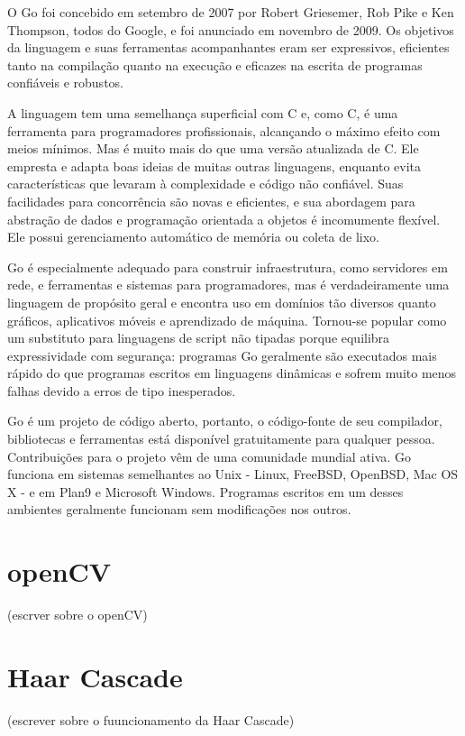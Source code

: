 \documentclass[12pt, %
openright, 
oneside, %
a4paper,    %
brazil]{facom-ufu-abntex2}
\begin{document}
O Go foi concebido em setembro de 2007 por Robert Griesemer, Rob Pike e Ken
Thompson, todos do Google, e foi anunciado em novembro de 2009. Os objetivos da
linguagem e suas ferramentas acompanhantes eram ser expressivos, eficientes
tanto na compilação quanto na execução e eficazes na escrita de programas
confiáveis e robustos.

A linguagem tem uma semelhança superficial com C e, como C, é uma ferramenta
para programadores profissionais, alcançando o máximo efeito com meios mínimos.
Mas é muito mais do que uma versão atualizada de C. Ele empresta e adapta boas
ideias de muitas outras linguagens, enquanto evita características que levaram
à complexidade e código não confiável. Suas facilidades para concorrência são
novas e eficientes, e sua abordagem para abstração de dados e programação
orientada a objetos é incomumente flexível. Ele possui gerenciamento automático
de memória ou coleta de lixo.

Go é especialmente adequado para construir infraestrutura, como servidores em
rede, e ferramentas e sistemas para programadores, mas é verdadeiramente uma
linguagem de propósito geral e encontra uso em domínios tão diversos quanto
gráficos, aplicativos móveis e aprendizado de máquina. Tornou-se popular como
um substituto para linguagens de script não tipadas porque equilibra
expressividade com segurança: programas Go geralmente são executados mais
rápido do que programas escritos em linguagens dinâmicas e sofrem muito menos
falhas devido a erros de tipo inesperados.

Go é um projeto de código aberto, portanto, o código-fonte de seu compilador,
bibliotecas e ferramentas está disponível gratuitamente para qualquer pessoa.
Contribuições para o projeto vêm de uma comunidade mundial ativa. Go funciona
em sistemas semelhantes ao Unix - Linux, FreeBSD, OpenBSD, Mac OS X - e em
Plan9 e Microsoft Windows. Programas escritos em um desses ambientes geralmente
funcionam sem modificações nos outros. \cite{donovan2015go}

\section{openCV}

 (escrver sobre o openCV)

\section{Haar Cascade}
 (escrever sobre o fuuncionamento da Haar Cascade)
\end{document}
